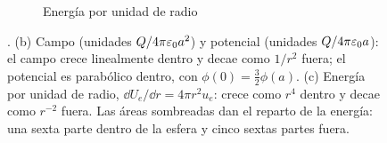 \begin{figure}[t]
\begin{subfigure}[b]{0.34\textwidth}
\caption{Energía por unidad de radio}
\end{subfigure}
\caption{. (b) Campo (unidades $Q/4\pi\varepsilon_0 a^2$) y potencial (unidades $Q/4\pi\varepsilon_0 a$): el campo crece linealmente
dentro y decae como $1/r^2$ fuera; el potencial es parabólico dentro, con $\phi(0)=\frac32\phi(a)$. (c) Energía por unidad de radio,
$\dd U_e/\dd r=4\pi r^2u_e$: crece como $r^4$ dentro y decae como $r^{-2}$ fuera. Las áreas sombreadas dan el reparto de la energía:
una sexta parte dentro de la esfera y cinco sextas partes fuera.}
\label{fig:p51}
\end{figure}
